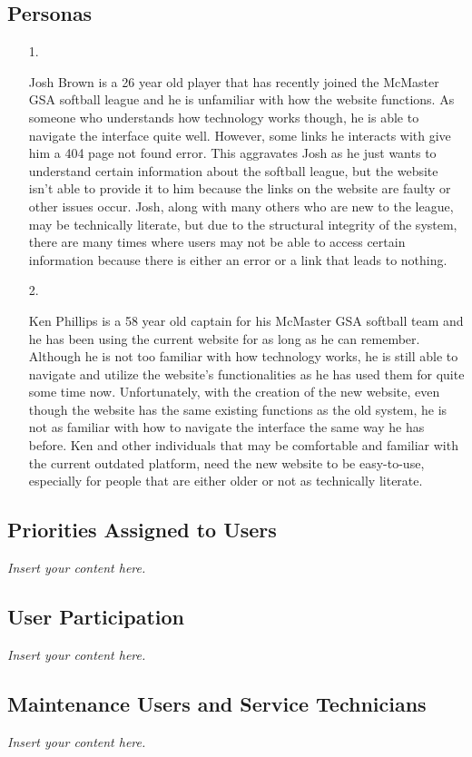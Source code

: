 \documentclass[12pt]{article}
\newcommand{\lips}{\textit{Insert your content here.}}
\begin{document}
\subsection{Personas}

\begin{itemize}
  \item [1.]
  
  Josh Brown is a 26 year old player that has recently joined the McMaster GSA
  softball league and he is unfamiliar with how the website functions. As someone
  who understands how technology works though, he is able to navigate the interface
  quite well. However, some links he interacts with give him a 404 page not found
  error. This aggravates Josh as he just wants to understand certain information
  about the softball league, but the website isn't able to provide it to him
  because the links on the website are faulty or other issues occur. Josh, along
  with many others who are new to the league, may be technically literate, but due
  to the structural integrity of the system, there are many times where users may
  not be able to access certain information because there is either an error or a
  link that leads to nothing.
  \item [2.]
  
  Ken Phillips is a 58 year old captain for his McMaster GSA softball team and he has
  been using the current website for as long as he can remember. Although he is not
  too familiar with how technology works, he is still able to navigate and utilize the
  website's functionalities as he has used them for quite some time now. Unfortunately,
  with the creation of the new website, even though the website has the same existing
  functions as the old system, he is not as familiar with how to navigate the interface
  the same way he has before. Ken and other individuals that may be comfortable and
  familiar with the current outdated platform, need the new website to be easy-to-use,
  especially for people that are either older or not as technically literate.
\end{itemize}

\subsection{Priorities Assigned to Users}
\lips
\subsection{User Participation}
\lips
\subsection{Maintenance Users and Service Technicians}
\lips
\end{document}
